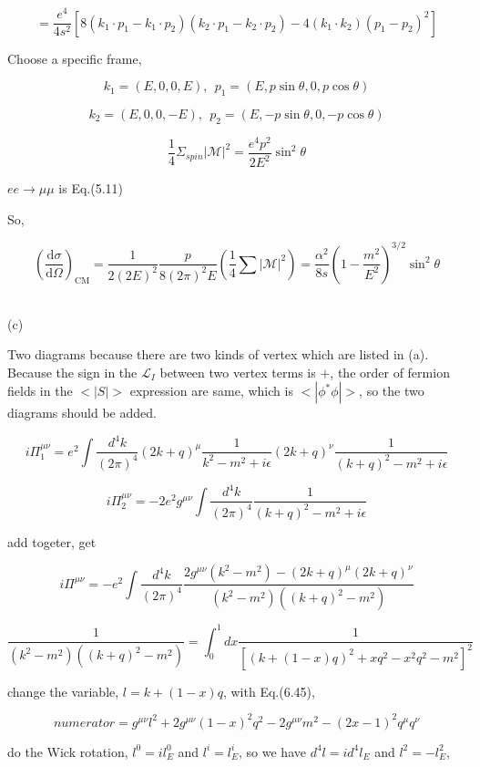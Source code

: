 \documentclass[11pt]{article} %
\begin{document}
\[ = \frac{e^{4}}{4 s^{2}}\left[8\left(k_{1} \cdot p_{1}-k_{1} \cdot p_{2}\right)\left(k_{2} \cdot p_{1}-k_{2} \cdot p_{2}\right)-4\left(k_{1} \cdot k_{2}\right)\left(p_{1}-p_{2}\right)^{2}\right] \]

Choose a specific frame, 

\[ k_{1}=(E, 0,0, E), \ \  p_{1}=(E, p \sin \theta, 0, p \cos \theta) \]

\[k_{2}=(E, 0,0,-E), \ \  p_{2}=(E,-p \sin \theta, 0,-p \cos \theta)\]

\[ \frac{1}{4} \Sigma_{spin} |\mathcal{M}|^2 = \frac{e^{4} p^{2}}{2 E^{2}} \sin ^{2} \theta \]

$ee \to \mu \mu$ is Eq.(5.11)

So,

\[
    \left(\frac{\mathrm{d} \sigma}{\mathrm{d} \Omega}\right)_{\mathrm{CM}}=\frac{1}{2(2 E)^{2}} \frac{p}{8(2 \pi)^{2} E}\left(\frac{1}{4} \sum|\mathcal{M}|^{2}\right)=\frac{\alpha^{2}}{8 s}\left(1-\frac{m^{2}}{E^{2}}\right)^{3 / 2} \sin ^{2} \theta 
\]

~\\
\noindent (c)

Two diagrams because there are two kinds of vertex which are listed in (a). Because the sign in the $\mathcal{L}_I$ between two vertex terms is $+$, the order of fermion fields in the $<|S|>$ expression are same, which is $< |\phi^* \phi| >$, so the two diagrams should be added.


\[ i \Pi^{\mu \nu}_1 = e^2 \int \frac{d^4 k}{(2\pi)^4} (2k + q)^{\mu} \frac{1}{k^2 - m^2 + i \epsilon} (2k+q)^{\nu} \frac{1}{(k+q)^2 - m^2 + i \epsilon} \]

\[ i \Pi^{\mu \nu}_2 = - 2 e^2 g^{\mu \nu} \int \frac{d^4 k}{(2 \pi)^4} \frac{1}{(k+q)^2 - m^2 + i \epsilon} \]

add togeter, get

\[ i \Pi^{\mu \nu} = - e^2 \int \frac{d^4 k}{(2\pi)^4} \frac{2 g^{\mu \nu} (k^2 - m^2) - (2k + q)^{\mu} (2k+q)^{\nu}}{(k^2 - m^2)((k+q)^2 - m^2)} \]

\[ \frac{1}{(k^2 - m^2)((k+q)^2 - m^2)} = \int^1_0 dx \frac{1}{[(k + (1-x)q)^2 + xq^2 -x^2 q^2 - m^2]^2} \]

change the variable, $l = k + (1-x)q$, with Eq.(6.45),

\[ numerator = g^{\mu \nu} l^2 + 2 g^{\mu \nu} (1-x)^2 q^2 - 2 g^{\mu \nu} m^2 - (2x-1)^2 q^\mu q^\nu \]

do the Wick rotation, $l^0 = i l^0_E$ and $l^i = l^i_E$, so we have $d^4 l = i d^4 l_E$ and $l^2 = - l^2_E$,
\end{document}
